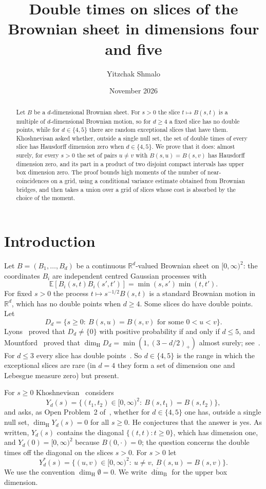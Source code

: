 \documentclass[11pt]{amsart}
\title[Double times on slices of the Brownian sheet]{Double times on slices of the Brownian sheet in dimensions four and five}
\author{Yitzchak Shmalo}
\date{November 2026}
\theoremstyle{remark}
\newcommand{\R}{\mathbb{R}}
\newcommand{\E}{\mathbb{E}}
\newcommand{\dimH}{\dim_{\mathrm H}}
\newcommand{\dimB}{\overline{\dim}_{\mathrm B}}
\begin{document}
\begin{abstract}
Let $B$ be a $d$-dimensional Brownian sheet. For $s>0$ the slice $t\mapsto B(s,t)$ is a multiple of $d$-dimensional
Brownian motion, so for $d\ge4$ a fixed slice has no double points, while for $d\in\{4,5\}$ there are random exceptional
slices that have them. Khoshnevisan asked whether, outside a single null set, the set of double times of every slice has
Hausdorff dimension zero when $d\in\{4,5\}$. We prove that it does: almost surely, for every $s>0$ the set of pairs
$u\ne v$ with $B(s,u)=B(s,v)$ has Hausdorff dimension zero, and its part in a product of two disjoint compact intervals
has upper box dimension zero. The proof bounds high moments of the number of near-coincidences on a grid, using a
conditional variance estimate obtained from Brownian bridges, and then takes a union over a grid of slices whose cost is
absorbed by the choice of the moment.
\end{abstract}
\maketitle

\section{Introduction}\label{sec:intro}

Let $B=(B_1,\dots,B_d)$ be a continuous $\R^d$-valued Brownian sheet on $[0,\infty)^2$: the coordinates $B_i$ are
independent centred Gaussian processes with
\[
\E[B_i(s,t)B_i(s',t')]=\min(s,s')\min(t,t').
\]
For fixed $s>0$ the process $t\mapsto s^{-1/2}B(s,t)$ is a standard Brownian motion in $\R^d$, which has no double
points when $d\ge4$. Some slices do have double points. Let
\[
D_d=\{s\ge0:\ B(s,u)=B(s,v)\text{ for some }0<u<v\}.
\]
Lyons~\cite{Lyo86} proved that $D_d\ne\{0\}$ with positive probability if and only if $d\le5$, and Mountford~\cite{Mou90}
proved that $\dimH D_d=\min(1,(3-d/2)_+)$ almost surely; see~\cite[(1.10) and (1.12)]{Kho05}. For $d\le3$ every slice
has double points~\cite{Pen89,Pen90}. So $d\in\{4,5\}$ is the range in which the exceptional slices are rare (in
$d=4$ they form a set of dimension one and Lebesgue measure zero) but present.

For $s\ge0$ Khoshnevisan~\cite[(8.2)]{Kho05} considers
\[
Y_d(s)=\{(t_1,t_2)\in[0,\infty)^2:\ B(s,t_1)=B(s,t_2)\},
\]
and asks, as Open Problem~2 of~\cite[Section~8.2]{Kho05}, whether for $d\in\{4,5\}$ one has, outside a single null set,
$\dimH Y_d(s)=0$ for all $s\ge0$. He conjectures that the answer is yes. As written, $Y_d(s)$ contains the diagonal
$\{(t,t):t\ge0\}$, which has dimension one, and $Y_d(0)=[0,\infty)^2$ because $B(0,\cdot)=0$; the question concerns the
double times off the diagonal on the slices $s>0$. For $s>0$ let
\begin{equation}\label{eq:Ystar}
Y^*_d(s)=\{(u,v)\in[0,\infty)^2:\ u\ne v,\ B(s,u)=B(s,v)\}.
\end{equation}
We use the convention $\dimH\emptyset=0$. We write $\dimB$ for the upper box dimension.
\end{document}
